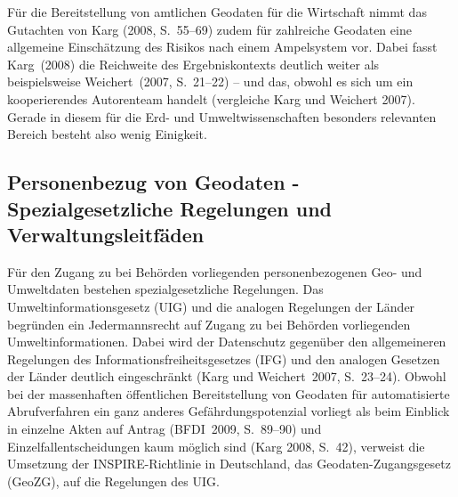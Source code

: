 \documentclass[a4paper,
fontsize=11pt,
oneside,
numbers=noperiodatend,
parskip=half-,
bibliography=totoc,
final
]{scrartcl}
\begin{document}
Für die Bereitstellung von amtlichen Geodaten für die Wirtschaft nimmt
das Gutachten von Karg (2008, S.~55--69) zudem für zahlreiche Geodaten
eine allgemeine Einschätzung des Risikos nach einem Ampelsystem vor.
Dabei fasst Karg~(2008) die Reichweite des Ergebniskontexts deutlich
weiter als beispielsweise Weichert~(2007, S.~21--22) -- und das, obwohl
es sich um ein kooperierendes Autorenteam handelt (vergleiche Karg und
Weichert 2007). Gerade in diesem für die Erd- und Umweltwissenschaften
besonders relevanten Bereich besteht also wenig Einigkeit.

\hypertarget{personenbezug-von-geodaten---spezialgesetzliche-regelungen-und-verwaltungsleitfuxe4den}{%
\subsection{Personenbezug von Geodaten - Spezialgesetzliche Regelungen
und
Verwaltungsleitfäden}\label{personenbezug-von-geodaten---spezialgesetzliche-regelungen-und-verwaltungsleitfuxe4den}}

Für den Zugang zu bei Behörden vorliegenden personenbezogenen Geo- und
Umweltdaten bestehen spezialgesetzliche Regelungen. Das
Umweltinformationsgesetz (UIG) und die analogen Regelungen der Länder
begründen ein Jedermannsrecht auf Zugang zu bei Behörden vorliegenden
Umweltinformationen. Dabei wird der Datenschutz gegenüber den
allgemeineren Regelungen des Informationsfreiheitsgesetzes (IFG) und den
analogen Gesetzen der Länder deutlich eingeschränkt (Karg und
Weichert~2007, S.~23--24). Obwohl bei der massenhaften öffentlichen
Bereitstellung von Geodaten für automatisierte Abrufverfahren ein ganz
anderes Gefährdungspotenzial vorliegt als beim Einblick in einzelne
Akten auf Antrag (BFDI~2009, S.~89--90) und Einzelfallentscheidungen
kaum möglich sind (Karg 2008, S.~42), verweist die Umsetzung der
INSPIRE-Richtlinie in Deutschland, das Geodaten-Zugangsgesetz (GeoZG),
auf die Regelungen des UIG.
\end{document}
